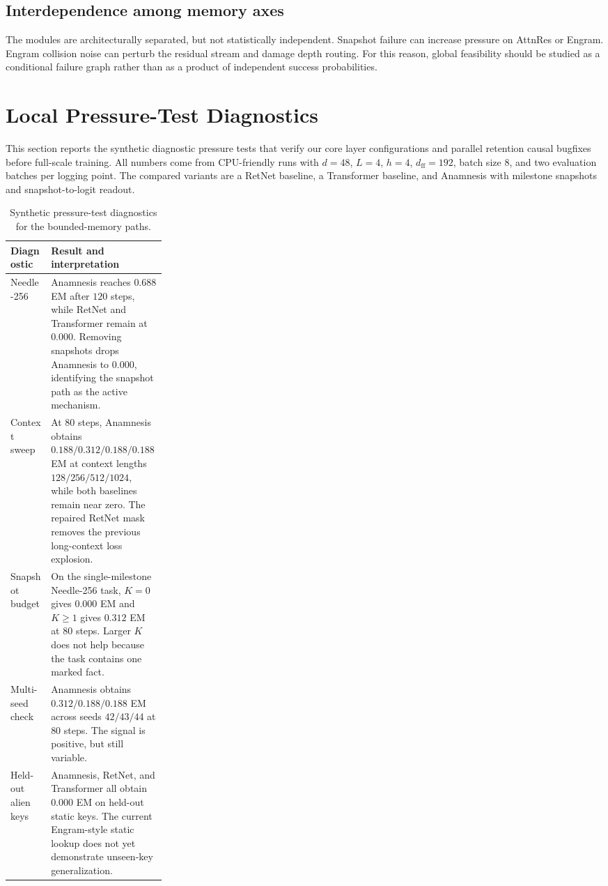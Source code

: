 \documentclass[preprint,12pt]{elsarticle}
\begin{document}
\subsection{Interdependence among memory axes}

The modules are architecturally separated, but not statistically independent. Snapshot failure can increase pressure on AttnRes or Engram. Engram collision noise can perturb the residual stream and damage depth routing. For this reason, global feasibility should be studied as a conditional failure graph rather than as a product of independent success probabilities.

\section{Local Pressure-Test Diagnostics}
\label{sec:local-pressure}

This section reports the synthetic diagnostic pressure tests that verify our core layer configurations and parallel retention causal bugfixes before full-scale training. All numbers come from CPU-friendly runs with $d=48$, $L=4$, $h=4$, $d_{\mathrm{ff}}=192$, batch size $8$, and two evaluation batches per logging point. The compared variants are a RetNet baseline, a Transformer baseline, and Anamnesis with milestone snapshots and snapshot-to-logit readout.

\begin{table}[htbp]
\centering
\caption{Synthetic pressure-test diagnostics for the bounded-memory paths.}
\label{tab:pressure-tests}
\small
\begin{tabularx}{\linewidth}{p{0.26\linewidth}X}
\toprule
Diagnostic & Result and interpretation \\
\midrule
Needle-256 & Anamnesis reaches $0.688$ EM after $120$ steps, while RetNet and Transformer remain at $0.000$. Removing snapshots drops Anamnesis to $0.000$, identifying the snapshot path as the active mechanism. \\
Context sweep & At $80$ steps, Anamnesis obtains $0.188/0.312/0.188/0.188$ EM at context lengths $128/256/512/1024$, while both baselines remain near zero. The repaired RetNet mask removes the previous long-context loss explosion. \\
Snapshot budget & On the single-milestone Needle-256 task, $K=0$ gives $0.000$ EM and $K\geq1$ gives $0.312$ EM at $80$ steps. Larger $K$ does not help because the task contains one marked fact. \\
Multi-seed check & Anamnesis obtains $0.312/0.188/0.188$ EM across seeds $42/43/44$ at $80$ steps. The signal is positive, but still variable. \\
Held-out alien keys & Anamnesis, RetNet, and Transformer all obtain $0.000$ EM on held-out static keys. The current Engram-style static lookup does not yet demonstrate unseen-key generalization. \\
\bottomrule
\end{tabularx}
\end{table}
\end{document}
